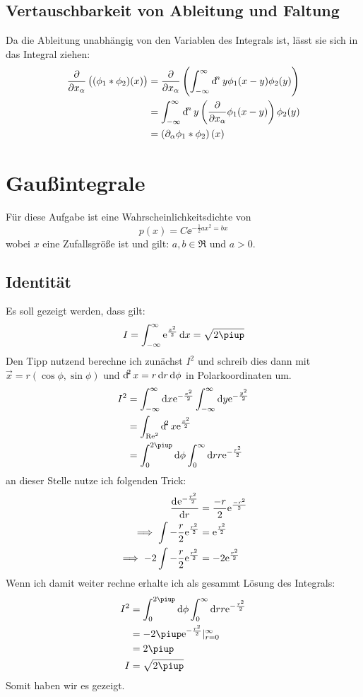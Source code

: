 \subsection{Vertauschbarkeit von Ableitung und Faltung}
Da die Ableitung unabhängig von den Variablen des Integrals ist, lässt sie sich in das Integral ziehen:
\begin{align}
  \frac{\partial}{\partial x_\alpha} \left((\phi_1 * \phi_2)(x)\right) &= \frac{\partial}{\partial x_\alpha} \left(\int^\infty_{-\infty}\dif^n y \phi_1(x-y)\phi_2(y)\right)	\\
  &= \int^\infty_{-\infty}\dif^n y \left(\frac{\partial}{\partial x_\alpha} \phi_1(x-y)\right)\phi_2(y)	\\
  &= \left(\partial_\alpha \phi_1 * \phi_2\right)(x)
\end{align}


\section{Gaußintegrale}
Für diese Aufgabe ist eine Wahrscheinlichkeitsdichte von 
\[
    p(x) = C\ee^{-\frac 12ax^2=bx} 
\]
wobei $x$ eine Zufallsgröße ist und gilt: $a,b\in\Re$ und $a>0$.

\subsection{Identität}
Es soll gezeigt werden, dass gilt:
\[
    I = \int^\infty_{-\infty}\ee^{\frac{x^2}{2}}\dif x = \sqrt{2\piup}
\]
Den Tipp nutzend berechne ich zunächst $I^2$ und schreib dies dann mit $\vec x = r(\cos\phi,\sin\phi)$ und $\dif^2x = r\dif r\dif\phi$  in Polarkoordinaten um.
\begin{align*}
    I^2 &= \int^\infty_{-\infty}\dif x\ee^{-\frac{x^2}{2}}\int^\infty_{-\infty}\dif y\ee^{-\frac{y^2}{2}} \\
        &= \int_{\Re^2}\dif^2x\ee^{\frac{x^2}{2}} \\
        &= \int^{2\piup}_0\dif\phi\int^\infty_0\dif rr\ee^{-\frac{r^2}{2}} \\
\end{align*}
an dieser Stelle nutze ich folgenden Trick:
\begin{align*}
    \dod {\ee^{-\frac{r^2}{2}}}{r} &= \frac{-r}{2}\ee^{\frac{-r^2}{2}} \\
    \implies \int -\frac r2 \ee^{\frac{r^2}2} &= \ee^{\frac{r^2}2} \\
    \implies -2\int -\frac r2 \ee^{\frac{r^2}2} &= -2\ee^{\frac{r^2}2} \\
\end{align*}
Wenn ich damit weiter rechne erhalte ich als gesammt Lösung des Integrals:
\begin{align*}
    I^2 &= \int^{2\piup}_0\dif\phi\int^\infty_0\dif rr\ee^{-\frac{r^2}{2}} \\
        &=-2\piup\ee^{-\frac{r^2}2}|^\infty_{r=0} \\
        &= 2\piup \\
    I &= \sqrt{2\piup}
\end{align*}
Somit haben wir es gezeigt.

